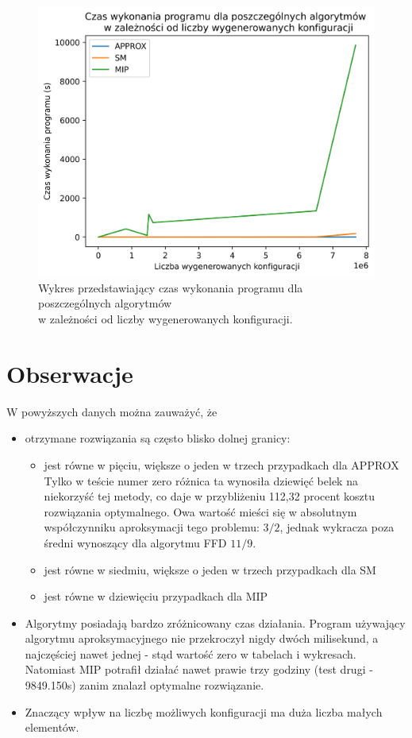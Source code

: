 \begin{figure}[H]
	\begin{center}
		\includegraphics[width=12cm]{plots/time_configs}
		\caption{Wykres przedstawiający czas wykonania programu dla poszczególnych algorytmów \\ w zależności od liczby wygenerowanych konfiguracji.}
	\end{center}
\end{figure}

\newpage
\section{Obserwacje}

W powyższych danych można zauważyć, że
\begin{itemize}
	\item otrzymane rozwiązania są często blisko dolnej granicy:
	\begin{itemize}
		\item jest równe w pięciu, większe o jeden w trzech przypadkach dla APPROX \\
		Tylko w teście numer zero różnica ta wynosiła dziewięć belek na niekorzyść tej metody, co daje w przybliżeniu 112,32 procent kosztu rozwiązania optymalnego. Owa wartość mieści się w absolutnym współczynniku aproksymacji tego problemu: $3/2$, jednak wykracza poza średni wynoszący dla algorytmu FFD $11/9$.
		\item jest równe w siedmiu, większe o jeden w trzech przypadkach dla SM
		\item jest równe w dziewięciu przypadkach dla MIP
	\end{itemize}
	\item Algorytmy posiadają bardzo zróżnicowany czas działania.
	Program używający algorytmu aproksymacyjnego nie przekroczył nigdy dwóch milisekund, a najczęściej nawet jednej - stąd wartość zero w tabelach i wykresach. Natomiast MIP potrafił działać nawet prawie trzy godziny (test drugi - 9849.150s) zanim znalazł optymalne rozwiązanie. 
	\item Znaczący wpływ na liczbę możliwych konfiguracji ma duża liczba małych elementów.
	
\end{itemize}

